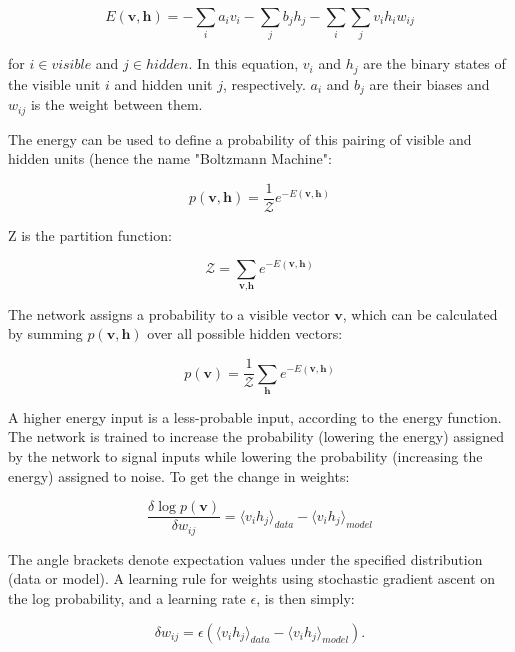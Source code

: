 \begin{equation}
E(\textbf{v},\textbf{h}) = - \sum_{i} a_{i} v_{i} -\sum_{j} b_{j} h_{j} - \sum_{i}\sum_{j}v_{i}h_{i}w_{ij}
\end{equation}

for $i \in visible$ and $j \in hidden$. In this equation, $v_{i}$ and $h_{j}$ are the binary states of the visible unit $i$ and hidden unit $j$, respectively. $a_{i}$ and $b_{j}$ are their biases and $w_{ij}$ is the weight between them. 

The energy can be used to define a probability of this pairing of visible and hidden units (hence the name "Boltzmann Machine":

\begin{equation}
p(\textbf{v},\textbf{h}) = \frac{1}{\mathcal{Z}} e^{-E(\textbf{v},\textbf{h})}
\end{equation}

Z is the partition function:

\begin{equation}
\mathcal{Z} = \sum_{\textbf{v},\textbf{h}} e^{-E(\textbf{v},\textbf{h})}
\end{equation}

The network assigns a probability to a visible vector $\textbf{v}$, which can be calculated by summing $p(\textbf{v},\textbf{h})$ over all possible hidden vectors:

\begin{equation}
p(\textbf{v}) = \frac{1}{\mathcal{Z}} \sum_{\textbf{h}} e^{-E(\textbf{v},\textbf{h})}
\end{equation}

A higher energy input is a less-probable input, according to the energy function. The network is trained to increase the probability (lowering the energy) assigned by the network to signal inputs while lowering the probability (increasing the energy) assigned to noise. To get the change in weights:

\begin{equation}
\frac{\delta \log p(\textbf{v})}{\delta w_{ij}} = \langle v_{i} h_{j} \rangle_{data} - \langle v_{i} h_{j} \rangle_{model}
\end{equation}

The angle brackets denote expectation values under the specified distribution (data or model). A learning rule for weights using stochastic gradient ascent on the log probability, and a learning rate $\epsilon$, is then simply:

\begin{equation}
\delta w_{ij} = \epsilon ( \langle v_{i} h_{j} \rangle_{data} - \langle v_{i} h_{j} \rangle_{model} ).
\end{equation}

